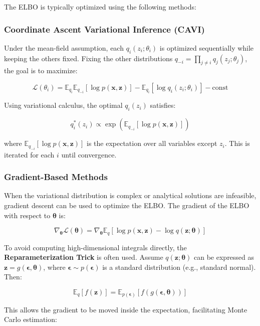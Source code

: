 \documentclass[10pt]{elegantbook}
\begin{document}
The ELBO is typically optimized using the following methods:

\subsubsection{Coordinate Ascent Variational Inference (CAVI)}

Under the mean-field assumption, each \( q_i(z_i; \theta_i) \) is optimized sequentially while keeping the others fixed. Fixing the other distributions \( q_{-i} = \prod_{j \neq i} q_j(z_j; \theta_j) \), the goal is to maximize:

\[
\mathcal{L}(\theta_i) = \mathbb{E}_{q_i} \mathbb{E}_{q_{-i}} [\log p(\mathbf{x}, \mathbf{z})] - \mathbb{E}_{q_i} [\log q_i(z_i; \theta_i)] - \text{const}
\]

Using variational calculus, the optimal \( q_i(z_i) \) satisfies:

\[
q_i^*(z_i) \propto \exp \left( \mathbb{E}_{q_{-i}} [\log p(\mathbf{x}, \mathbf{z})] \right)
\]

where \( \mathbb{E}_{q_{-i}} [\log p(\mathbf{x}, \mathbf{z})] \) is the expectation over all variables except \( z_i \). This is iterated for each \( i \) until convergence.

\subsubsection{Gradient-Based Methods}

When the variational distribution is complex or analytical solutions are infeasible, gradient descent can be used to optimize the ELBO. The gradient of the ELBO with respect to \( \boldsymbol{\theta} \) is:

\[
\nabla_{\boldsymbol{\theta}} \mathcal{L}(\boldsymbol{\theta}) = \nabla_{\boldsymbol{\theta}} \mathbb{E}_q [\log p(\mathbf{x}, \mathbf{z}) - \log q(\mathbf{z}; \boldsymbol{\theta})]
\]

To avoid computing high-dimensional integrals directly, the \textbf{Reparameterization Trick} is often used. Assume \( q(\mathbf{z}; \boldsymbol{\theta}) \) can be expressed as \( \mathbf{z} = g(\boldsymbol{\epsilon}, \boldsymbol{\theta}) \), where \( \boldsymbol{\epsilon} \sim p(\boldsymbol{\epsilon}) \) is a standard distribution (e.g., standard normal). Then:

\[
\mathbb{E}_q [f(\mathbf{z})] = \mathbb{E}_{p(\boldsymbol{\epsilon})} [f(g(\boldsymbol{\epsilon}, \boldsymbol{\theta}))]
\]

This allows the gradient to be moved inside the expectation, facilitating Monte Carlo estimation:
\end{document}
